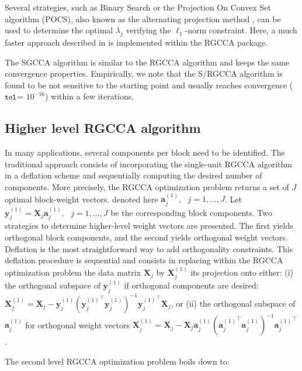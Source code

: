 \documentclass[
]{jss}
\begin{document}
Several strategies, such as Binary Search or the Projection On Convex
Set algorithm (POCS), also known as the alternating projection method
\citep{Boyd2003}, can be used to determine the optimal \(\lambda_j\)
verifying the \(\ell_1\)-norm constraint. Here, a much faster approach
described in \cite{Gloaguen2017} is implemented within the RGCCA
package.

The SGCCA algorithm is similar to the RGCCA algorithm and keeps the same
convergence properties. Empirically, we note that the S/RGCCA algorithm
is found to be not sensitive to the starting point and usually reaches
convergence (\(\small{\texttt{tol}}\)= \(10^{-16}\)) within a few
iterations.

\hypertarget{higher-level-rgcca-algorithm}{%
\subsection{Higher level RGCCA
algorithm}\label{higher-level-rgcca-algorithm}}

In many applications, several components per block need to be
identified. The traditional approach consists of incorporating the
single-unit RGCCA algorithm in a deflation scheme and sequentially
computing the desired number of components. More precisely, the RGCCA
optimization problem returns a set of \(J\) optimal block-weight
vectors. denoted here \(\mathbf a_j^{(1)}, \text{ } j = 1, \ldots, J\).
Let
\(\mathbf y_j^{(1)} = \mathbf X_j \mathbf a_j^{(1)}, \text{ } j = 1, \ldots, J\)
be the corresponding block components. Two strategies to determine
higher-level weight vectors are presented. The first yields orthogonal
block components, and the second yields orthogonal weight vectors.
Deflation is the most straightforward way to add orthogonality
constraints. This deflation procedure is sequential and consists in
replacing within the RGCCA optimization problem the data matrix
\(\mathbf X_j\) by \(\mathbf X_j^{(1)}\) its projection onto either: (i)
the orthogonal subspace of \(\mathbf y_j^{(1)}\) if orthogonal
components are desired:
\(\mathbf X_j^{(1)} = \mathbf X_j - \mathbf y_j^{(1)} \left( { \mathbf y_j^{(1)}}^\top \mathbf y_j^{(1)} \right)^{-1}{ \mathbf y_j^{(1)}}^\top \mathbf X_j\),
or (ii) the orthogonal subspace of \(\mathbf a_j^{(1)}\) for orthogonal
weight vectors
\(\mathbf X_j^{(1)} = \mathbf X_j - \mathbf X_j \mathbf a_j^{(1)} \left( { \mathbf a_j^{(1)}}^\top \mathbf a_j^{(1)} \right)^{-1}{ \mathbf a_j^{(1)}}^\top\).

The second level RGCCA optimization problem boils down to:
\end{document}
